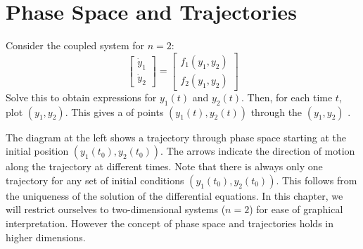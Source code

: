 \section{Phase Space and Trajectories}

Consider the coupled system for $n=2$:
$$\begin{bmatrix} \dot{y}_1 \\ \dot{y}_2\end{bmatrix} =
\begin{bmatrix} f_1(y_1,y_2) \\ f_2(y_1,y_2)\end{bmatrix}$$
Solve this to obtain expressions for $y_1(t)$ and $y_2(t)$.  Then, for each 
time $t$, plot $(y_1,y_2)$.  This gives a  of points
$(y_1(t),y_2(t))$ through the $(y_1,y_2)$ .

\begin{window}[0,l,{%
\psset{unit=2.5cm}
\begin{pspicture}(-0.4,-0.3)(1.4,1.5)
\psplot[linecolor=gray,linewidth=1.5pt,plotstyle=curve]%
{0}{1.1}{x 1.5 sub x mul 0.66 add x mul 0.1 add 3 mul}
\psset{linewidth=1.2pt,linecolor=black}
\psline{->}(-0.3,0)(1.1,0)
\psline{->}(-0.1,-0.2)(-0.1,1.2)
\uput[r](1.1,0){$y_1$}
\uput[u](-0.1,1.2){$y_2$}
\rput{63}(0,0.3){\psline[linewidth=1.2pt]{->}(0,0)(0.3,0)\rput[tl]{*0}(0.1,-0.1){$t_0$}}
\put(0.333,0.5778){\psline[linewidth=1.2pt]{->}(0,0)(0.3,0)\rput[br](0.1,0.1){$t_1$}}
\put(0.667,0.5222){\psline[linewidth=1.2pt]{->}(0,0)(0.3,0)\rput[br](0.1,0.1){$t_2$}}
\rput{63}(1,0.8){\psline[linewidth=1.2pt]{->}(0,0)(0.3,0)\rput[br]{*0}(0.1,0.1){$t_3$}}
\end{pspicture}
},{}]
The diagram at the left shows a trajectory through phase space starting at the initial
position $(y_1(t_0),y_2(t_0))$.  The arrows indicate the direction of motion
along the trajectory at different times.
Note that there is always only one trajectory for any set of initial
conditions $(y_1(t_0),y_2(t_0))$.  This follows from the uniqueness of the
solution of the differential equations.
In this chapter, we will restrict ourselves to two-dimensional systems
($n=2$) for ease of graphical interpretation.  However the concept of phase
space and trajectories holds in higher dimensions.
\end{window}


